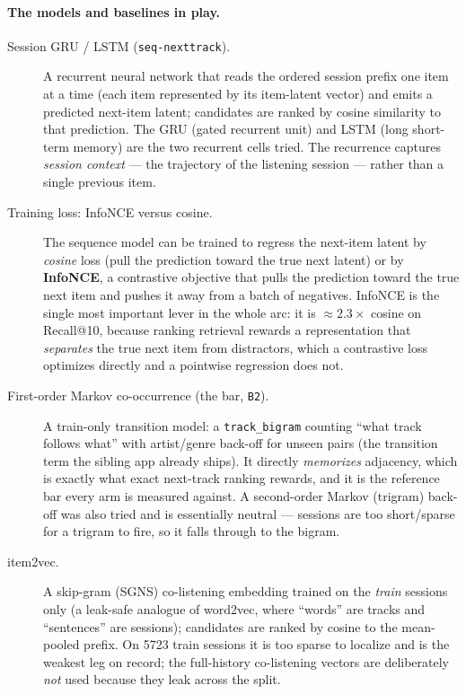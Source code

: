 \documentclass[11pt]{article}
\begin{document}
\paragraph{The models and baselines in play.}
\begin{description}
  \item[Session GRU / LSTM (\texttt{seq-nexttrack}).] A recurrent neural network
  that reads the ordered session prefix one item at a time (each item
  represented by its item-latent vector) and emits a predicted next-item latent;
  candidates are ranked by cosine similarity to that prediction. The GRU (gated
  recurrent unit) and LSTM (long short-term memory) are the two recurrent cells
  tried. The recurrence captures \emph{session context} --- the trajectory of
  the listening session --- rather than a single previous item.
  \item[Training loss: InfoNCE versus cosine.] The sequence model can be trained
  to regress the next-item latent by \emph{cosine} loss (pull the prediction
  toward the true next latent) or by \textbf{InfoNCE}, a contrastive objective
  that pulls the prediction toward the true next item and pushes it away from a
  batch of negatives. InfoNCE is the single most important lever in the whole
  arc: it is $\approx 2.3\times$ cosine on Recall@10, because ranking retrieval
  rewards a representation that \emph{separates} the true next item from
  distractors, which a contrastive loss optimizes directly and a pointwise
  regression does not.
  \item[First-order Markov co-occurrence (the bar, \texttt{B2}).] A train-only
  transition model: a \texttt{track\_bigram} counting ``what track follows what''
  with artist/genre back-off for unseen pairs (the transition term the sibling
  app already ships). It directly \emph{memorizes} adjacency, which is exactly
  what exact next-track ranking rewards, and it is the reference bar every arm is
  measured against. A second-order Markov (trigram) back-off was also tried and
  is essentially neutral --- sessions are too short/sparse for a trigram to fire,
  so it falls through to the bigram.
  \item[item2vec.] A skip-gram (SGNS) co-listening embedding trained on the
  \emph{train} sessions only (a leak-safe analogue of word2vec, where ``words''
  are tracks and ``sentences'' are sessions); candidates are ranked by cosine to
  the mean-pooled prefix. On \num{5723} train sessions it is too sparse to
  localize and is the weakest leg on record; the full-history co-listening
  vectors are deliberately \emph{not} used because they leak across the split.

\end{description}
\end{document}
